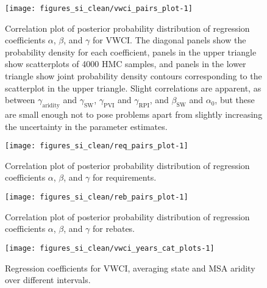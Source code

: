 \documentclass[draft]{agujournal}
\begin{document}

\begin{figure}
\texttt{[image: figures\_si\_clean/vwci\_pairs\_plot-1]} \caption[Correlation plot of posterior probability distribution of regression coefficients $\alpha$, $\beta$, and $\gamma$ for VWCI]{Correlation plot of posterior probability distribution of regression coefficients $\alpha$, $\beta$, and $\gamma$ for VWCI. The diagonal panels show the probability density for each coefficient, panels in the upper triangle show scatterplots of 4000 HMC samples, and panels in the lower triangle show joint probability density contours corresponding to the scatterplot in the upper triangle. Slight correlations are apparent, as between $\gamma_{\text{aridity}}$ and $\gamma_{\text{SW}}$, $\gamma_{\text{PVI}}$ and $\gamma_{\text{RPI}}$, and $\beta_{\text{SW}}$ and $\alpha_0$, but these are small enough not to pose problems apart from slightly increasing the uncertainty in the parameter estimates.}\label{fig:vwci_pairs_plot}
\end{figure}




\begin{figure}
\texttt{[image: figures\_si\_clean/req\_pairs\_plot-1]} \caption[Correlation plot of posterior probability distribution of regression coefficients $\alpha$, $\beta$, and $\gamma$ for requirements]{Correlation plot of posterior probability distribution of regression coefficients $\alpha$, $\beta$, and $\gamma$ for requirements.}\label{fig:req_pairs_plot}
\end{figure}




\begin{figure}
\texttt{[image: figures\_si\_clean/reb\_pairs\_plot-1]} \caption[Correlation plot of posterior probability distribution of regression coefficients $\alpha$, $\beta$, and $\gamma$ for rebates]{Correlation plot of posterior probability distribution of regression coefficients $\alpha$, $\beta$, and $\gamma$ for rebates.}\label{fig:reb_pairs_plot}
\end{figure}




\begin{figure}
\texttt{[image: figures\_si\_clean/vwci\_years\_cat\_plots-1]} \caption[Regression coefficients for VWCI, averaging state and MSA aridity over different intervals]{Regression coefficients for VWCI, averaging state and MSA aridity over different intervals.}\label{fig:vwci_years_cat_plots}
\end{figure}
\end{document}

